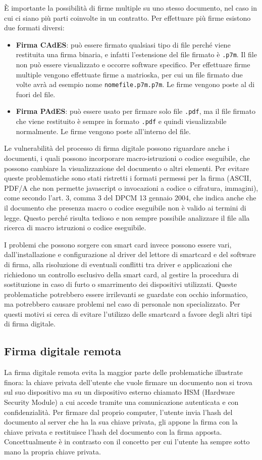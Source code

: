 È importante la possibilità di firme multiple su uno stesso documento, nel caso in cui ci siano più parti coinvolte in un contratto. Per effettuare più firme esistono due formati diversi:
\begin{itemize}
    \item \textbf{Firma CAdES}: può essere firmato qualsiasi tipo di file perché viene restituita una firma binaria, e infatti l'estensione del file firmato è \texttt{.p7m}. Il file non può essere visualizzato e occorre software specifico. Per effettuare firme multiple vengono effettuate firme a matrioska, per cui un file firmato due volte avrà ad esempio nome \texttt{nomefile.p7m.p7m}. Le firme vengono poste al di fuori del file.
    \item \textbf{Firma PAdES}: può essere usato per firmare solo file \texttt{.pdf}, ma il file firmato che viene restituito è sempre in formato \texttt{.pdf} e quindi visualizzabile normalmente. Le firme vengono poste all'interno del file.
\end{itemize}
Le vulnerabilità del processo di firma digitale possono riguardare anche i documenti, i quali possono incorporare macro-istruzioni o codice eseguibile, che possono cambiare la visualizzazione del documento o altri elementi. Per evitare queste problematiche sono stati ristretti i formati permessi per la firma (ASCII, PDF/A che non permette javascript o invocazioni a codice o cifratura, immagini), come secondo l'art. 3, comma 3 del DPCM 13 gennaio 2004, che indica anche che il documento che presenza macro o codice eseguibile non è valido ai termini di legge. Questo perché risulta tedioso e non sempre possibile analizzare il file alla ricerca di macro istruzioni o codice eseguibile. 

I problemi che possono sorgere con smart card invece possono essere vari, dall'installazione e configurazione al driver del lettore di smartcard e del software di firma, alla risoluzione di eventuali conflitti tra driver e applicazioni che richiedono un controllo esclusivo della smart card, al gestire la procedura di sostituzione in caso di furto o smarrimento dei dispositivi utilizzati. Queste problematiche potrebbero essere irrilevanti se guardate con occhio informatico, ma potrebbero causare problemi nel caso di personale non specializzato. Per questi motivi si cerca di evitare l'utilizzo delle smartcard a favore degli altri tipi di firma digitale.

\subsection{Firma digitale remota}
La firma digitale remota evita la maggior parte delle problematiche illustrate finora: la chiave privata dell'utente che vuole firmare un documento non si trova sul suo dispositivo ma su un dispositivo esterno chiamato HSM (Hardware Security Module) a cui accede tramite una comunicazione autenticata e con confidenzialità. Per firmare dal proprio computer, l'utente invia l'hash del documento al server che ha la sua chiave privata, gli appone la firma con la chiave privata e restituisce l'hash del documento con la firma apposta. Concettualmente è in contrasto con il concetto per cui l'utente ha sempre sotto mano la propria chiave privata.

